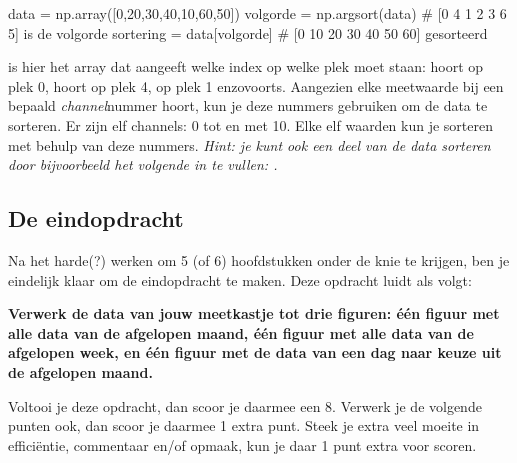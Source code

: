 \documentclass[a4paper,11pt, fleqn]{article}
\begin{document}
\begin{python}
data = np.array([0,20,30,40,10,60,50])
volgorde = np.argsort(data)		# [0 4 1 2 3 6 5] is de volgorde
sortering = data[volgorde]		# [0 10 20 30 40 50 60] gesorteerd
\end{python}

 is hier het array dat aangeeft welke index op welke plek moet staan:  hoort op plek 0,  hoort op plek 4,  op plek 1 enzovoorts. Aangezien elke meetwaarde bij een bepaald {\it channel}nummer hoort, kun je deze nummers gebruiken om de data te sorteren. Er zijn elf channels: 0 tot en met 10. Elke elf waarden kun je sorteren met behulp van deze nummers. {\it Hint: je kunt ook een deel van de data sorteren door bijvoorbeeld het volgende in te vullen: .}

\subsection{De eindopdracht}
Na het harde(?) werken om 5 (of 6) hoofdstukken onder de knie te krijgen, ben je eindelijk klaar om de eindopdracht te maken. Deze opdracht luidt als volgt: 

{\bf Verwerk de data van jouw meetkastje tot drie figuren: \'e\'en figuur met alle data van de afgelopen maand, \'e\'en figuur met alle data van de afgelopen week, en \'e\'en figuur met de data van een dag naar keuze uit de afgelopen maand.}

Voltooi je deze opdracht, dan scoor je daarmee een 8. Verwerk je de volgende punten ook, dan scoor je daarmee 1 extra punt. Steek je extra veel moeite in effici\"entie, commentaar en/of opmaak, kun je daar 1 punt extra voor scoren.
\end{document}
